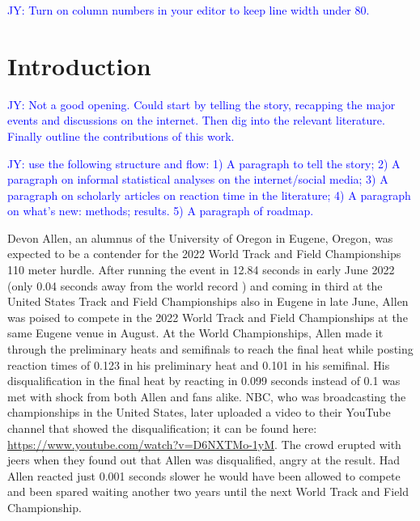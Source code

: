 \documentclass[12pt, letterpaper, titlepage]{article}
\newcommand{\jy}[1]{\textcolor{blue}{JY: #1}}
\newcommand{\eds}[1]{\textcolor{red}{EDS: (#1)}}
\begin{document}
\jy{Turn on column numbers in your editor to keep line width under 80.}

\section{Introduction}
\label{sec:intro}


\jy{Not a good opening. Could start by telling the story, recapping the major
  events and discussions on the internet. Then dig into the relevant
  literature. Finally outline the contributions of this work.
}


\jy{use the following structure and flow:
  1) A paragraph to tell the story;
  2) A paragraph on informal statistical analyses on the internet/social media;
  3) A paragraph on scholarly articles on reaction time in the literature;
  4) A paragraph on what's new: methods; results.
  5) A paragraph of roadmap.}


Devon Allen, an alumnus of the University of Oregon in 
Eugene, Oregon, was
expected to be a contender for the 2022 World Track and Field Championships 110 
meter hurdle.  After running the event in 12.84 seconds in early June 2022 
(only 0.04 seconds away from the world record \citep{wa2022preview}) and coming 
in third at the United States Track and Field 
Championships also in Eugene in late June, Allen was poised to compete in the 
2022 World Track and Field Championships at the same Eugene venue in August.
At the World Championships, Allen made it through the preliminary
heats and semifinals to reach the final heat while posting reaction times of 
0.123 in his preliminary heat and 0.101 in his semifinal.  
His disqualification in the final heat by reacting in 0.099 seconds instead of 
0.1 was met
with shock from both Allen and fans alike.  NBC, who was broadcasting the
championships in the United States, later uploaded a video to their YouTube
channel that showed the disqualification; it can be found here:
\url{https://www.youtube.com/watch?v=D6NXTMo-1yM}. The crowd erupted with jeers 
when they found out that Allen was disqualified, angry at the result.  Had Allen 
reacted just 0.001 seconds slower he would have been allowed to compete and been 
spared waiting another two years until the next World Track and Field Championship.
\end{document}
